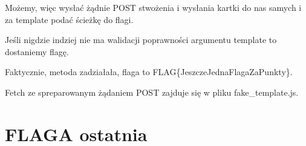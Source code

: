 \documentclass{article}
\begin{document}
Możemy, więc wysłać żądnie POST stwożenia i wysłania kartki do nas samych i za template podać ścieżkę do flagi. 

Jeśli nigdzie indziej nie ma walidacji poprawności argumentu template to dostaniemy flagę.

Faktycznie, metoda zadziałała, flaga to FLAG\{JeszczeJednaFlagaZaPunkty\}.

Fetch ze spreparowanym żądaniem POST zajduje się w pliku fake\_template.js.

\section*{FLAGA ostatnia}
\end{document}
